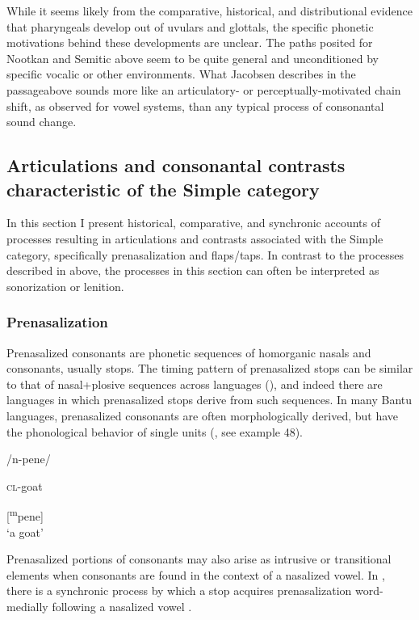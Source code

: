   While it seems likely from the comparative, historical, and distributional evidence that pharyngeals develop out of uvulars and glottals, the specific phonetic motivations behind these developments are unclear. The paths posited for Nootkan and Semitic above seem to be quite general and unconditioned by specific vocalic or other environments. What Jacobsen describes in the passage\linebreak above sounds more like an articulatory- or perceptually-motivated chain shift, as observed for vowel systems, than any typical process of consonantal sound change.

\subsection{Articulations and consonantal contrasts characteristic of the Simple category}\label{sec:4.5.3}

  In this section I present historical, comparative, and synchronic accounts of processes resulting in articulations and contrasts associated with the Simple category, specifically prenasalization and flaps/taps. In contrast to the processes described in  above, the processes in this section can often be interpreted as sonorization or lenition.

\subsubsection{{Prenasalization} }\label{sec:4.5.3.1}

  Prenasalized consonants are phonetic sequences of homorganic nasals and consonants, usually stops. The timing pattern of prenasalized stops can be similar to that of nasal+plosive sequences across languages (\citealt{BrowmanGoldstein1986}), and indeed there are languages in which prenasalized stops derive from such sequences. In many Bantu languages, prenasalized consonants are often morphologically derived, but have the phonological behavior of single units (\citealt{Tak2011}, see example 48).

\ea\label{ex:4.48}

/n-pene/

\textsc{cl}-goat

[\textsuperscript{m}pene]\\
\glt ‘a goat’
\citep[132]{Tak2011}
\z

  Prenasalized portions of consonants may also arise as intrusive or transitional elements when consonants are found in the context of a nasalized vowel. In , there is a synchronic process by which a stop acquires prenasalization word-medially following a nasalized vowel .

